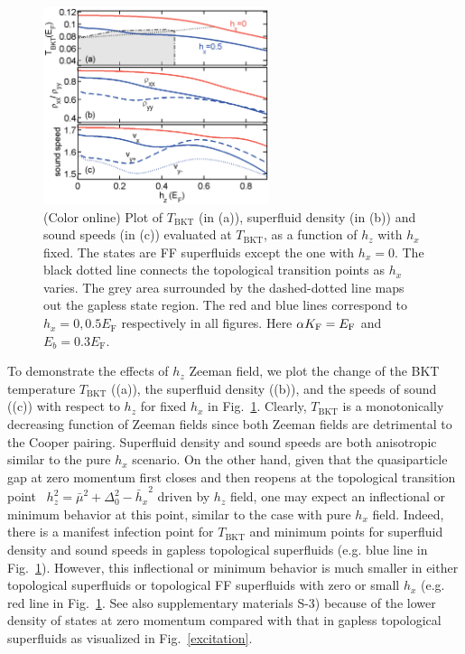\documentclass[prl,aps,twocolumn,showpacs, floatfix]{revtex4}
\begin{document}
\begin{figure}[t]
\includegraphics[width=2.6in]{T_hz.eps}
\caption{(Color online) Plot of $T_{\mathrm{BKT}}$ (in (a)), superfluid
density (in (b)) and sound speeds (in (c)) evaluated at $T_{\mathrm{BKT}}$,
as a function of $h_{z}$ with $h_{x}$ fixed. The states are FF superfluids
except the one with $h_{x}=0$. The black dotted line connects the
topological transition points as $h_{x}$ varies. The grey area surrounded by
the dashed-dotted line maps out the gapless state region. The red and blue
lines correspond to $h_{x}=0,0.5E_{\mathrm{F}}$ respectively in all figures.
Here $\protect\alpha K_{\mathrm{F}}=E_{\mathrm{F}}$ and $E_{b}=0.3E_{\mathrm{F}}$.}
\label{TS_FF}
\end{figure}

To demonstrate the effects of $h_{z}$ Zeeman field, we plot the change of
the BKT temperature $T_{\mathrm{BKT}}$ ((a)), the superfluid density ((b)),
and the speeds of sound ((c)) with respect to $h_{z}$ for fixed $h_{x}$ in
Fig.~\ref{TS_FF}. Clearly, $T_{\mathrm{BKT}}$ is a monotonically decreasing
function of Zeeman fields since both Zeeman fields are detrimental to the
Cooper pairing. Superfluid density and sound speeds are both anisotropic
similar to the pure $h_{x}$ scenario. On the other hand, given that the
quasiparticle gap at zero momentum first closes and then reopens at the
topological transition point~\cite%
{Qu2013NC,Yi2013NC,XJ2013PRA,Chun2013PRL,Yong2014PRL,MGong2014PRB,YGao2014arXiv,Hu2014arXiv}
$h_{z}^{2}={\bar{\mu}}^{2}+\Delta _{0}^{2}-{\bar{h}_{x}}^{2}$ driven by $%
h_{z}$ field, one may expect an inflectional or minimum behavior at this
point, similar to the case with pure $h_{x}$ field. Indeed, there is a
manifest infection point for $T_{\mathrm{BKT}}$ and minimum points for
superfluid density and sound speeds in gapless topological superfluids (e.g.
blue line in Fig.~\ref{TS_FF}). However, this inflectional or minimum
behavior is much smaller in either topological superfluids or topological FF
superfluids with zero or small $h_{x}$ (e.g. red line in Fig.~\ref{TS_FF}.
See also supplementary materials S-3) because of the lower density of states
at zero momentum compared with that in gapless topological superfluids as
visualized in Fig.~\ref{excitation}.
\end{document}
